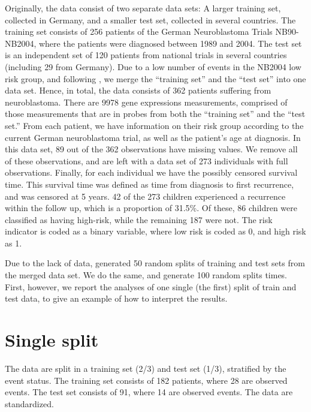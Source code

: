 Originally, the data consist of two separate data sets:
A larger training set, collected in Germany, and a smaller test set, collected in several countries.
The training set consists of 256 patients of the German Neuroblastoma Trials NB90-NB2004, where the patients were diagnosed between 1989 and 2004.
The test set is an independent set of 120 patients from national trials in several countries (including 29 from Germany).
Due to a low number of events in the NB2004 low risk group, and following \citet{bovelstad2009}, we merge the ``training set'' and the ``test set'' into one data set.
Hence, in total, the data consists of 362 patients suffering from neuroblastoma.
There are 9978 gene expressions measurements, comprised of those measurements that are in probes from both the ``training set'' and the ``test set.''
From each patient, we have information on their risk group according to the current German neuroblastoma trial, as well as the patient's age at diagnosis.
In this data set, 89 out of the 362 observations have missing values.
We remove all of these observations, and are left with a data set of 273 individuals with full observations.
Finally, for each individual we have the possibly censored survival time.
This survival time was defined as time from diagnosis to first recurrence, and was censored at 5 years.
42 of the 273 children experienced a recurrence within the follow up, which is a proportion of 31.5\%.
Of these, 86 children were classified as having high-risk, while the remaining 187 were not.
The risk indicator is coded as a binary variable, where low risk is coded as 0, and high risk as 1.

Due to the lack of data, \citet{bovelstad2009} generated 50 random splits of training and test sets from the merged data set.
We do the same, and generate 100 random splits times.
First, however, we report the analyses of one single (the first) split of train and test data, to give an example of how to interpret the results.

\section{Single split}
The data are split in a training set (2/3) and test set (1/3), stratified by the event status.
The training set consists of 182 patients, where 28 are observed events.
The test set consists of 91, where 14 are observed events.
The data are standardized.

